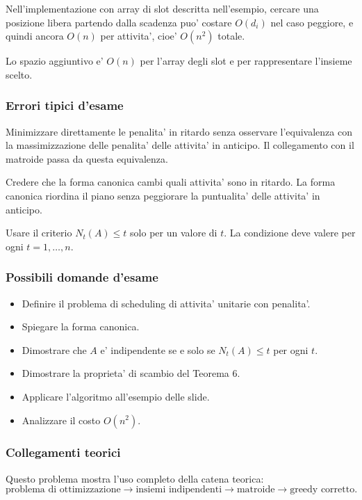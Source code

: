 Nell'implementazione con array di slot descritta nell'esempio, cercare una posizione libera partendo dalla scadenza puo' costare $O(d_i)$ nel caso peggiore, e quindi ancora $O(n)$ per attivita', cioe' $O(n^2)$ totale.

Lo spazio aggiuntivo e' $O(n)$ per l'array degli slot e per rappresentare l'insieme scelto.

\subsubsection{Errori tipici d'esame}
\begin{hardnote}
Minimizzare direttamente le penalita' in ritardo senza osservare l'equivalenza con la massimizzazione delle penalita' delle attivita' in anticipo. Il collegamento con il matroide passa da questa equivalenza.
\end{hardnote}

\begin{hardnote}
Credere che la forma canonica cambi quali attivita' sono in ritardo. La forma canonica riordina il piano senza peggiorare la puntualita' delle attivita' in anticipo.
\end{hardnote}

\begin{hardnote}
Usare il criterio $N_t(A)\le t$ solo per un valore di $t$. La condizione deve valere per ogni $t=1,\ldots,n$.
\end{hardnote}

\subsubsection{Possibili domande d'esame}
\begin{itemize}
	\item Definire il problema di scheduling di attivita' unitarie con penalita'.
	\item Spiegare la forma canonica.
	\item Dimostrare che $A$ e' indipendente se e solo se $N_t(A)\le t$ per ogni $t$.
	\item Dimostrare la proprieta' di scambio del Teorema 6.
	\item Applicare l'algoritmo all'esempio delle slide.
	\item Analizzare il costo $O(n^2)$.
\end{itemize}

\subsubsection{Collegamenti teorici}
Questo problema mostra l'uso completo della catena teorica:
\[
\text{problema di ottimizzazione}
\longrightarrow
\text{insiemi indipendenti}
\longrightarrow
\text{matroide}
\longrightarrow
\text{greedy corretto}.
\]

